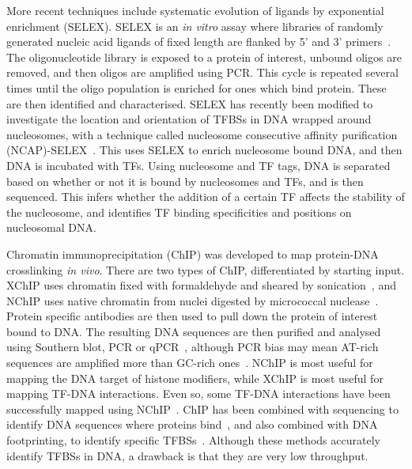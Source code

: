 \documentclass[../main.tex]{subfiles}
\begin{document}
More recent techniques include systematic evolution of ligands by exponential enrichment (SELEX).
SELEX is an \textit{in vitro} assay where libraries of randomly generated nucleic acid ligands of fixed length are flanked by 5' and 3' primers~\autocite{tuerkSystematicEvolutionLigands1990}.
The oligonucleotide library is exposed to a protein of interest, unbound oligos are removed, and then oligos are amplified using PCR.
This cycle is repeated several times until the oligo population is enriched for ones which bind protein.
These are then identified and characterised.
SELEX has recently been modified to investigate the location and orientation of TFBSs in DNA wrapped around nucleosomes, with a technique called nucleosome consecutive affinity purification (NCAP)\hyp{}SELEX~\autocite{zhuInteractionLandscapeTranscription2018}.
This uses SELEX to enrich nucleosome bound DNA, and then DNA is incubated with TFs.
Using nucleosome and TF tags, DNA is separated based on whether or not it is bound by nucleosomes and TFs, and is then sequenced.
This infers whether the addition of a certain TF affects the stability of the nucleosome, and identifies TF binding specificities and positions on nucleosomal DNA.

Chromatin immunoprecipitation (ChIP) was developed to map protein\hyp{}DNA crosslinking \textit{in vivo}.
There are two types of ChIP, differentiated by starting input.
XChIP uses chromatin fixed with formaldehyde and sheared by sonication~\autocite{solomonMappingProteinDNAInteractions1988,orlandoMappingChromosomalProteins2000}, and NChIP uses native chromatin from nuclei digested by micrococcal nuclease~\autocite{hebbesDirectLinkCore1988}.
Protein specific antibodies are then used to pull down the protein of interest bound to DNA.
The resulting DNA sequences are then purified and analysed using Southern blot, PCR or qPCR~\autocite{dasChromatinImmunoprecipitationAssay2004}, although PCR bias may mean AT\hyp{}rich sequences are amplified more than GC\hyp{}rich ones~\autocite{weinmannIdentificationUnknownTarget2002}.
NChIP is most useful for mapping the DNA target of histone modifiers, while XChIP is most useful for mapping TF\hyp{}DNA interactions.
Even so, some TF\hyp{}DNA interactions have been successfully mapped using NChIP~\autocite{gregoryDNAMethylationLinked2001}.
ChIP has been combined with sequencing to identify DNA sequences where proteins bind~\autocite{weinmannUseChromatinImmunoprecipitation2001}, and also combined with DNA footprinting, to identify specific TFBSs~\autocite{leekangCombiningChromatinImmunoprecipitation2002}.
Although these methods accurately identify TFBSs in DNA, a drawback is that they are very low throughput.
\end{document}
